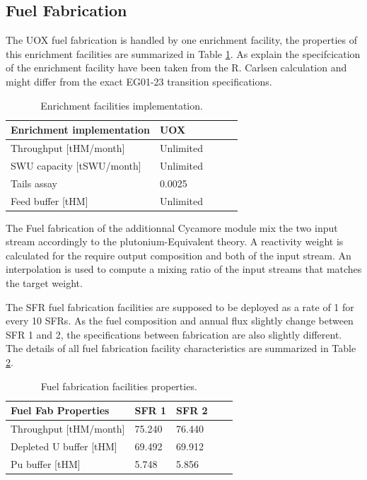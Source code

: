 \documentclass[12pt]{article}
\begin{document}
\subsection{Fuel Fabrication}

The UOX fuel fabrication is handled by one enrichment facility, the properties
of this enrichment facilities are summarized in Table \ref{tab:enrich_1}. As
explain the specifcication of the enrichment facility have been taken from the
R. Carlsen calculation and might differ from the exact EG01-23 transition
specifications. 

\begin{table}[h!]
    \centering
    \begin{tabular}{lllll}
    \hline
    Enrichment implementation  &  UOX        \\
    \hline
    Throughput [tHM/month]     &  Unlimited  \\
    SWU capacity [tSWU/month]  &  Unlimited  \\
    Tails assay                &  0.0025     \\
    Feed buffer [tHM]          &  Unlimited  \\
    \hline
    \end{tabular}
    \caption{Enrichment facilities implementation. }
    \label{tab:enrich_1}
\end{table}


The Fuel fabrication of the additionnal Cycamore module mix the two input stream
accordingly to the plutonium-Equivalent theory\cite{Pueq}. A reactivity weight is
calculated for the require output composition and both of the input stream. An
interpolation is used to compute a mixing ratio of the input streams that matches
the target weight.

The SFR fuel fabrication facilities are supposed to be deployed as a rate of 1 for
every 10 SFRs.  As the fuel composition and annual flux slightly change between
SFR 1 and 2, the specifications between fabrication are also slightly
different. The details of all fuel fabrication facility characteristics are
summarized in Table \ref{tab:fuelfab_1}.

\begin{table}[h!]
    \centering
    \begin{tabular}{lllll}
    \hline
    Fuel Fab Properties      &  SFR 1   &  SFR 2   \\
    \hline
    Throughput [tHM/month]   &  75.240  &  76.440  \\
    Depleted U buffer [tHM]  &  69.492  &  69.912  \\
    Pu buffer  [tHM]         &  5.748   &  5.856   \\
    \hline
    \end{tabular}
    \caption{Fuel fabrication facilities properties.}
    \label{tab:fuelfab_1}
\end{table}
\end{document}

